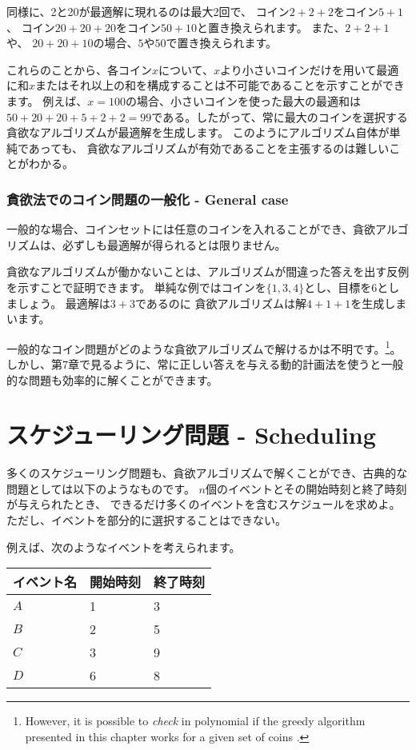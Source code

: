同様に、2と20が最適解に現れるのは最大2回で、
コイン$2+2+2$をコイン$5+1$、
コイン$20+20+20$をコイン$50+10$と置き換えられます。
また、$2+2+1$ や、 $20+20+10$の場合、$5$や$50$で置き換えられます。

これらのことから、各コイン$x$について、$x$より小さいコインだけを用いて最適に和$x$またはそれ以上の和を構成することは不可能であることを示すことができます。
例えば、$x = 100$の場合、小さいコインを使った最大の最適和は$50+20+20+5+2+2 = 99$である。したがって、常に最大のコインを選択する貪欲なアルゴリズムが最適解を生成します。
このようにアルゴリズム自体が単純であっても、
貪欲なアルゴリズムが有効であることを主張するのは難しいことがわかる。

\subsubsection{貪欲法でのコイン問題の一般化 - General case}

一般的な場合、コインセットには任意のコインを入れることができ、貪欲アルゴリズムは、必ずしも最適解が得られるとは限りません。

貪欲なアルゴリズムが働かないことは、アルゴリズムが間違った答えを出す反例を示すことで証明できます。
単純な例ではコインを$\{1,3,4\}$とし、目標を6としましょう。
最適解は$3 + 3$であるのに
貪欲アルゴリズムは解$4 + 1 + 1$を生成しまいます。

一般的なコイン問題がどのような貪欲アルゴリズムで解けるかは不明です。\footnote{However, it is possible
to \emph{check} in polynomial 
if the greedy algorithm presented in this chapter works for
a given set of coins \cite{pea05}.}。
しかし、第7章で見るように、常に正しい答えを与える動的計画法を使うと一般的な問題も効率的に解くことができます。

\section{スケジューリング問題 - Scheduling}

多くのスケジューリング問題も、貪欲アルゴリズムで解くことができ、古典的な問題としては以下のようなものです。
$n$個のイベントとその開始時刻と終了時刻が与えられたとき、
できるだけ多くのイベントを含むスケジュールを求めよ。
ただし、イベントを部分的に選択することはできない。

例えば、次のようなイベントを考えられます。
\begin{center}
\begin{tabular}{lll}
イベント名 & 開始時刻 & 終了時刻 \\
\hline
$A$ & 1 & 3 \\
$B$ & 2 & 5 \\
$C$ & 3 & 9 \\
$D$ & 6 & 8 \\
\end{tabular}
\end{center}

